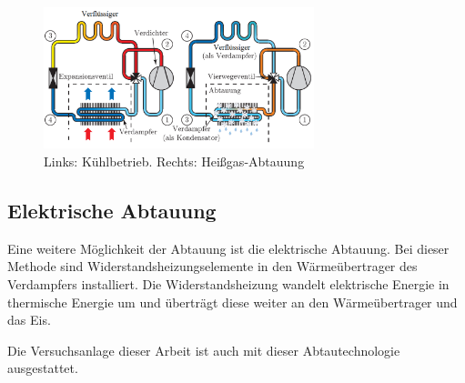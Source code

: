 \begin{figure}[htb]
\centering		\includegraphics[width=0.7\textwidth]{Pictures/Prozessumkehrung_Kosowski.png}
\caption{Links: Kühlbetrieb. Rechts: Heißgas-Abtauung \citep{Kosowski2009}}
\label{fig:Prozessumkehrung}
\end{figure}

\subsection*{Elektrische Abtauung}

Eine weitere Möglichkeit der Abtauung ist die elektrische Abtauung. Bei dieser Methode sind Widerstandsheizungselemente in den Wärmeübertrager des Verdampfers installiert. Die Widerstandsheizung wandelt elektrische Energie in thermische Energie um und überträgt diese weiter an den Wärmeübertrager und das Eis. 





Die Versuchsanlage dieser Arbeit ist auch mit dieser Abtautechnologie ausgestattet. 

